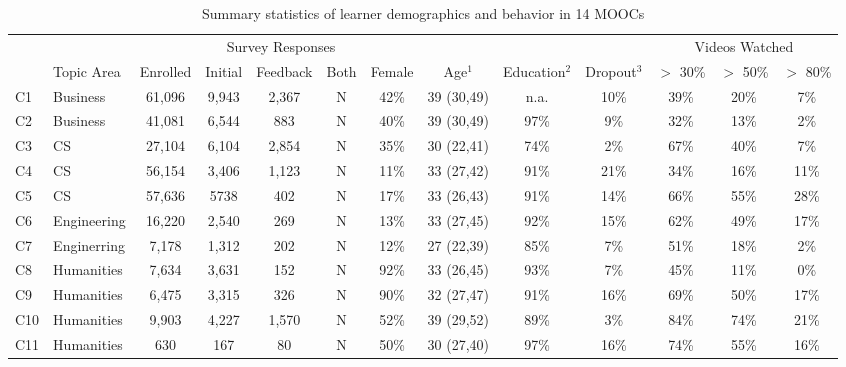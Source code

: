 \documentclass{sigchi}\usepackage[]{graphicx}\usepackage[]{color}
\begin{document}
\begin{table}[th]
\label{tab:s1sum}
\caption{Summary statistics of learner demographics and behavior in 14 MOOCs}
\small
\center
\begin{tabular}{llccccccccccc}
\toprule
 &            &          & \multicolumn{3}{c}{Survey Responses} & & & & & \multicolumn{3}{c}{Videos Watched} \\
 \cmidrule(r){4-6} \cmidrule(r){11-13}
 & Topic Area & Enrolled & Initial & Feedback & Both & Female & Age$^1$   & Education$^2$ & Dropout$^3$ & $>$ 30\% & $>$ 50\% & $>$ 80\% \\
\midrule
C1 & Business & 61,096   & 9,943  & 2,367    & N    & 42\%   & 39 (30,49) & n.a.       & 10\% & 39\% & 20\% & 7\% \\
C2 & Business & 41,081   & 6,544  & 883      & N    & 40\%   & 39 (30,49) & 97\%       & 9\%  & 32\% & 13\% & 2\% \\
C3 & CS       & 27,104   & 6,104 & 2,854     & N    & 35\%   & 30 (22,41) & 74\%       & 2\%  & 67\% & 40\% & 7\% \\
C4 & CS       & 56,154   & 3,406 & 1,123     & N    & 11\%   & 33 (27,42) & 91\%       & 21\% & 34\% & 16\% & 11\% \\
C5 & CS       & 57,636   & 5738  & 402       & N    & 17\%   & 33 (26,43) & 91\%       & 14\% & 66\% & 55\% & 28\% \\
C6 & Engineering & 16,220 & 2,540 & 269      & N    & 13\%   & 33 (27,45) & 92\%       & 15\% & 62\% & 49\% & 17\% \\
C7 & Enginerring & 7,178 & 1,312 & 202       & N    & 12\%   & 27 (22,39) & 85\%       & 7\%  & 51\% & 18\% & 2\% \\
C8 & Humanities & 7,634 & 3,631  & 152       & N    & 92\%   & 33 (26,45) & 93\%       & 7\%  & 45\% & 11\% & 0\% \\
C9 & Humanities & 6,475 & 3,315  & 326       & N    & 90\%   & 32 (27,47) & 91\%       & 16\% & 69\% & 50\% & 17\% \\
C10 & Humanities & 9,903 & 4,227 & 1,570     & N    & 52\%   & 39 (29,52) & 89\%       & 3\%  & 84\% & 74\% & 21\% \\
C11 & Humanities & 630 & 167     & 80        & N    & 50\%   & 30 (27,40) & 97\%       & 16\% & 74\% & 55\% & 16\% \\

\end{tabular}
\end{table}
\end{document}
